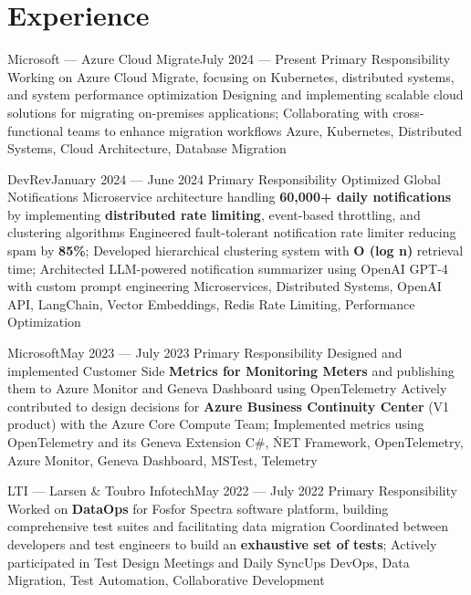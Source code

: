 \section{Experience}
\resumeSubHeadingListStart
{}
{Microsoft --- Azure Cloud Migrate}{July 2024 --- Present}
\resumeItemListStart
      \resumeItem
        {Primary Responsibility}
        {Working on Azure Cloud Migrate, focusing on Kubernetes, distributed systems, and system performance optimization}
      {Designing and implementing scalable cloud solutions for migrating on-premises applications; Collaborating with cross-functional teams to enhance migration workflows}
      {Azure, Kubernetes, Distributed Systems, Cloud Architecture, Database Migration}
  \resumeItemListEnd

{DevRev}{January 2024 --- June 2024}
\resumeItemListStart
      \resumeItem
        {Primary Responsibility}
        {Optimized Global Notifications Microservice architecture handling \textbf{60,000+ daily notifications} by implementing \textbf{distributed rate limiting}, event-based throttling, and clustering algorithms}
      {Engineered fault-tolerant notification rate limiter reducing spam by \textbf{85\%}; Developed hierarchical clustering system with \textbf{O (log n)} retrieval time; Architected LLM-powered notification summarizer using OpenAI GPT-4 with custom prompt engineering}
      {Microservices, Distributed Systems, OpenAI API, LangChain, Vector Embeddings, Redis Rate Limiting, Performance Optimization}
\resumeItemListEnd

{Microsoft}{May 2023 --- July 2023}
\resumeItemListStart
      \resumeItem
        {Primary Responsibility}
        {Designed and implemented Customer Side \textbf{Metrics for Monitoring Meters} and publishing them to Azure Monitor and Geneva Dashboard using OpenTelemetry}
      {Actively contributed to design decisions for \textbf{Azure Business Continuity Center} (V1 product) with the Azure Core Compute Team; Implemented metrics using OpenTelemetry and its Geneva Extension}
      {C\#, \.NET Framework, OpenTelemetry, Azure Monitor, Geneva Dashboard, MSTest, Telemetry}
\resumeItemListEnd

{LTI --- Larsen \& Toubro Infotech}{May 2022 --- July 2022}
\resumeItemListStart
      \resumeItem
        {Primary Responsibility}
        {Worked on \textbf{DataOps} for Fosfor Spectra software platform, building comprehensive test suites and facilitating data migration}
      {Coordinated between developers and test engineers to build an \textbf{exhaustive set of tests}; Actively participated in Test Design Meetings and Daily SyncUps}
      {DevOps, Data Migration, Test Automation, Collaborative Development}
\resumeItemListEnd
\resumeSubHeadingListEnd